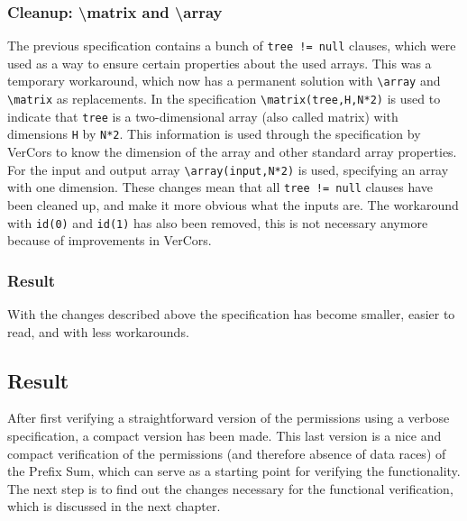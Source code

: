\documentclass[a4paper]{article}
\newcommand{\code}[1]{\texttt{\small \color{inline}#1}} %
\begin{document}
\subsubsection{Cleanup: \textbackslash matrix and \textbackslash array}
The previous specification contains a bunch of \code{tree != null} clauses, which were used as a way to ensure certain properties about the used arrays. This was a temporary workaround, which now has a permanent solution with \code{\textbackslash array} and \code{\textbackslash matrix} as replacements. In the specification \code{\textbackslash matrix(tree,H,N*2)} is used to indicate that \code{tree} is a two-dimensional array (also called matrix) with dimensions \code{H} by \code{N*2}. This information is used through the specification by VerCors to know the dimension of the array and other standard array properties. For the input and output array \code{\textbackslash array(input,N*2)} is used, specifying an array with one dimension. These changes mean that all \code{tree != null} clauses have been cleaned up, and make it more obvious what the inputs are. The workaround with \code{id(0)} and \code{id(1)} has also been removed, this is not necessary anymore because of improvements in VerCors.

\subsubsection{Result}
With the changes described above the specification has become smaller, easier to read, and with less workarounds.

\subsection{Result}
After first verifying a straightforward version of the permissions using a verbose specification, a compact version has been made. This last version is a nice and compact verification of the permissions (and therefore absence of data races) of the Prefix Sum, which can serve as a starting point for verifying the functionality. The next step is to find out the changes necessary for the functional verification, which is discussed in the next chapter.


\end{document}
